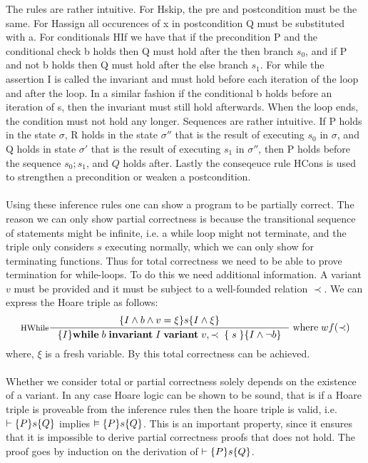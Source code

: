 The rules are rather intuitive.
For Hskip, the pre and postcondition must be the same.
For Hassign all occurences of x in postcondition Q must be substituted with a.
For conditionals HIf we have that if the precondition P and the conditional check b holds then Q must hold after the then branch $s_{0}$, and if P and not b holds then Q must hold after the else branch $s_1$.
For while the assertion I is called the invariant and must hold before each iteration of the loop and after the loop.
In a similar fashion if the conditional b holds before an iteration of s, then the invariant must still hold afterwards.
When the loop ends, the condition must not hold any longer.
Sequences are rather intuitive. If P holds in the state $\sigma$, R holds in the state $\sigma''$ that
is the result of executing $s_{0}$ in $\sigma$, and Q holds in state $\sigma'$ that is the result of
executing $s_{1}$ in $\sigma''$, then P holds before the sequence $s_{0}; s_{1}$, and $Q$ holds after.
Lastly the conseqeuce rule HCons is used to strengthen a precondition or weaken a postcondition.
\\~\\
Using these inference rules one can show a program to be partially correct.
The reason we can only show partial correctness is because the transitional sequence of statements might be infinite, i.e. a while loop might not terminate, and the triple only considers $s$ executing normally, which we can only show for terminating functions.
Thus for total correctness we need to be able to prove termination for while-loops.
To do this we need additional information.
A variant $v$ must be provided and it must
be subject to a well-founded relation $\prec$.
We can express the Hoare triple as follows:
\[
\inference[HWhile]{\hoare{I \wedge b \wedge v = \xi }{s}{I \wedge \xi}}
{\hoare{I}{ \mathbf{while} \; b \; \mathbf{invariant} \; I \; \mathbf{variant} \; v, \prec \; \{ \; s \; \} }{I \wedge \neg b}} \; \text{where} \; wf(\prec)
\]
where, $\xi$ is a fresh variable.
By this total correctness can be achieved.
\\~\\
Whether we consider total or partial correctness solely depends on the existence of a variant.
In any case Hoare logic can be shown to be sound, that is if a Hoare triple is proveable from the inference rules then the hoare triple is valid, i.e. $\vdash \{P\}s\{Q\}$ implies $\vDash \{P\}s\{Q\}$.
This is an important property, since it ensures that it is impossible to derive partial correctness proofs that does not hold.
The proof goes by induction on the derivation of $\vdash \{P\}s\{Q\}$.
